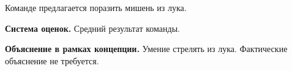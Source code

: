 
\par Команде предлагается поразить мишень из лука.

\par \textbf{Система оценок.} Средний результат команды.

\par \textbf{Объяснение в рамках концепции.} Умение стрелять из лука. Фактические объяснение не требуется.